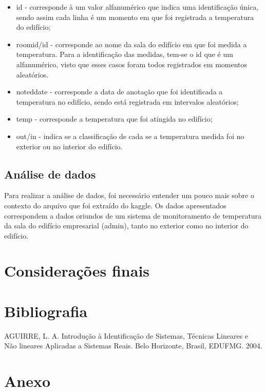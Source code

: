 \documentclass[a4paper, 12pt]{article}
\begin{document}
\begin{itemize}
     \item id - corresponde à um valor alfanumérico que indica uma identificação única, sendo assim cada linha é um momento em que foi registrada a temperatura do edifício;
    \item roomid/id - corresponde ao nome da sala do edifício em que foi medida a temperatura. Para a identificação das medidas, tem-se o id que é um alfanumérico, visto que esses casos foram todos registrados em momentos aleatórios.
    \item noteddate - corresponde a data de anotação que foi identificada a temperatura no edifício, sendo está registrada em intervalos aleatórios;
    \item temp - corresponde a temperatura que foi atingida no edifício;
    \item out/in - indica se a classificação de cada se a temperatura medida foi no exterior ou no interior do edifício.
\end{itemize}


\subsection{Análise de dados}
Para realizar a análise de dados, foi necessário entender um pouco mais sobre o contexto do arquivo que foi extraído do kaggle. Os dados apresentados correspondem a dados oriundos de um sistema de monitoramento de temperatura da sala do edifício empresarial (admin), tanto no exterior como no interior do edifício.
\newpage
\section{Considerações finais}
\newpage

\section*{Bibliografia}
\footnotesize{

\noindent AGUIRRE, L. A. Introdução à Identificação de Sistemas, Técnicas Lineares e Não lineares Aplicadas a Sistemas Reais. Belo Horizonte, Brasil, EDUFMG. 2004.\\

}
\newpage
{}
\section*{Anexo}
\end{document}
